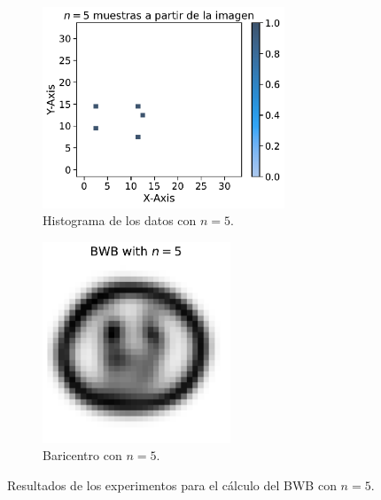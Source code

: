 \begin{figure}[H]
    \begin{subfigure}[t]{0.49\textwidth}
        \centering
        \includegraphics[height=6cm]{img/bwb/samples-hist-n-05.pdf}
        \caption{Histograma de los datos con $n=5$.}
        \label{fig:samples-hist-n-05}
    \end{subfigure}
    \hfill
    \begin{subfigure}[t]{0.49\textwidth}
        \centering
        \includegraphics[height=6cm]{img/bwb/BWB-n-data-05.pdf}
        \caption{Baricentro con $n=5$.}
        \label{fig:bwb-n-data-05}
    \end{subfigure}
    \caption{Resultados de los experimentos para el cálculo del BWB con $n=5$.}
    \label{fig:bwb-experiments-n-05}
\end{figure}

